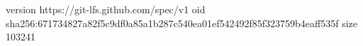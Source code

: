 version https://git-lfs.github.com/spec/v1
oid sha256:671734827a82f5c9df0a85a1b287c540ea01ef542492f85f323759b4eaff535f
size 103241
